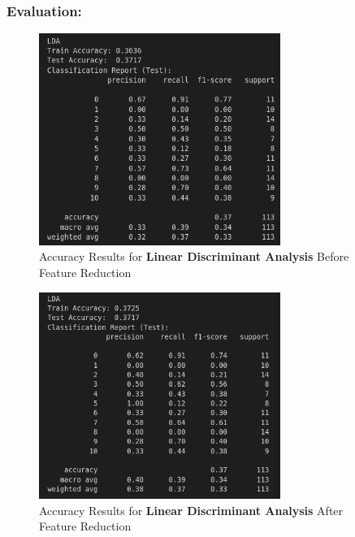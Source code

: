 \documentclass[a4paper,12pt]{article}
\begin{document}
\subsubsection{Evaluation:}
\begin{figure}[H]
    \centering
    \includegraphics[width=0.7\textwidth]{./images/ldaacc1.png}
    \caption{Accuracy Results for \textbf{Linear Discriminant Analysis} Before Feature Reduction}
    \label{fig:fig_29}
\end{figure}
\begin{figure}[H]
    \centering
    \includegraphics[width=0.7\textwidth]{./images/ldaacc2.png}
    \caption{Accuracy Results for \textbf{Linear Discriminant Analysis} After Feature Reduction}
    \label{fig:fig_30}
\end{figure}

\end{document}
